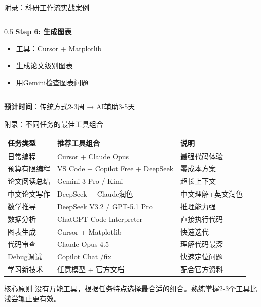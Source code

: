 \documentclass[aspectratio=169,11pt]{beamer}
\begin{document}
\begin{frame}{附录：科研工作流实战案例}
\begin{columns}
\begin{column}{0.5\textwidth}
            \vspace{0.2cm}
            \textbf{Step 6: 生成图表}
            \begin{itemize}
                \item 工具：Cursor + Matplotlib
                \item 生成论文级别图表
                \item 用Gemini检查图表问题
            \end{itemize}
        \end{column}
    \end{columns}
    
    \vspace{0.2cm}
    {\small \textbf{预计时间}：传统方式2-3周 → AI辅助3-5天}
\end{frame}

\begin{frame}{附录：不同任务的最佳工具组合}
    \footnotesize
    \begin{tabular}{p{3cm}p{4cm}p{5cm}}
        \toprule
        \textbf{任务类型} & \textbf{推荐工具组合} & \textbf{说明} \\
        \midrule
        日常编程 & Cursor + Claude Opus & 最强代码体验 \\
        预算有限编程 & VS Code + Copilot Free + DeepSeek & 零成本方案 \\
        论文阅读总结 & Gemini 3 Pro / Kimi & 超长上下文 \\
        中文论文写作 & DeepSeek + Claude润色 & 中文理解+英文润色 \\
        数学推导 & DeepSeek V3.2 / GPT-5.1 Pro & 推理能力强 \\
        数据分析 & ChatGPT Code Interpreter & 直接执行代码 \\
        图表生成 & Cursor + Matplotlib & 快速迭代 \\
        代码审查 & Claude Opus 4.5 & 理解代码最深 \\
        Debug调试 & Copilot Chat /fix & 快速定位问题 \\
        学习新技术 & 任意模型 + 官方文档 & 配合官方资料 \\
        \bottomrule
    \end{tabular}
    
    \vspace{0.3cm}
    \begin{alertblock}{核心原则}
        没有万能工具，根据任务特点选择最合适的组合。熟练掌握2-3个工具比浅尝辄止更有效。
    \end{alertblock}
\end{frame}
\end{document}
